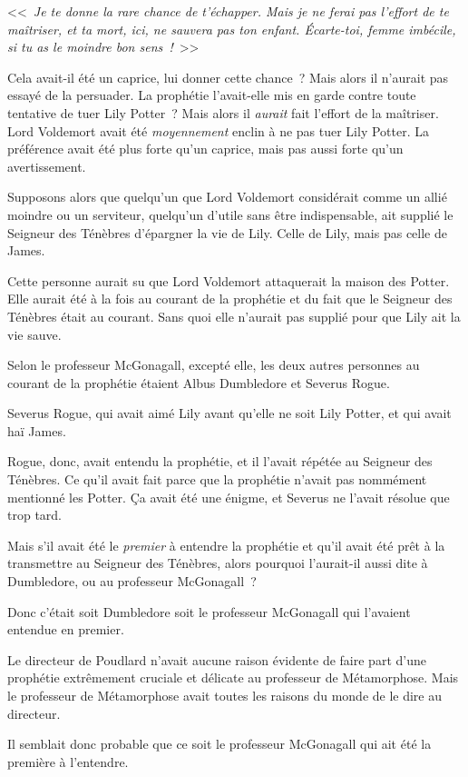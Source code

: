 <<~\emph{Je te donne la rare chance de t'échapper. Mais je ne ferai pas l'effort de te maîtriser, et ta mort, ici, ne sauvera pas ton enfant. Écarte-toi, femme imbécile, si tu as le moindre bon sens~!}~>>

Cela avait-il été un caprice, lui donner cette chance~? Mais alors il n'aurait pas essayé de la persuader. La prophétie l'avait-elle mis en garde contre toute tentative de tuer Lily Potter~? Mais alors il \emph{aurait} fait l'effort de la maîtriser. Lord Voldemort avait été \emph{moyennement} enclin à ne pas tuer Lily Potter. La préférence avait été plus forte qu'un caprice, mais pas aussi forte qu'un avertissement.

Supposons alors que quelqu'un que Lord Voldemort considérait comme un allié moindre ou un serviteur, quelqu'un d'utile sans être indispensable, ait supplié le Seigneur des Ténèbres d'épargner la vie de Lily. Celle de Lily, mais pas celle de James.

Cette personne aurait su que Lord Voldemort attaquerait la maison des Potter. Elle aurait été à la fois au courant de la prophétie et du fait que le Seigneur des Ténèbres était au courant. Sans quoi elle n'aurait pas supplié pour que Lily ait la vie sauve.

Selon le professeur McGonagall, excepté elle, les deux autres personnes au courant de la prophétie étaient Albus Dumbledore et Severus Rogue.

Severus Rogue, qui avait aimé Lily avant qu'elle ne soit Lily Potter, et qui avait haï James.

Rogue, donc, avait entendu la prophétie, et il l'avait répétée au Seigneur des Ténèbres. Ce qu'il avait fait parce que la prophétie n'avait pas nommément mentionné les Potter. Ça avait été une énigme, et Severus ne l'avait résolue que trop tard.

Mais s'il avait été le \emph{premier} à entendre la prophétie et qu'il avait été prêt à la transmettre au Seigneur des Ténèbres, alors pourquoi l'aurait-il aussi dite à Dumbledore, ou au professeur McGonagall~?

Donc c'était soit Dumbledore soit le professeur McGonagall qui l'avaient entendue en premier.

Le directeur de Poudlard n'avait aucune raison évidente de faire part d'une prophétie extrêmement cruciale et délicate au professeur de Métamorphose. Mais le professeur de Métamorphose avait toutes les raisons du monde de le dire au directeur.

Il semblait donc probable que ce soit le professeur McGonagall qui ait été la première à l'entendre.

